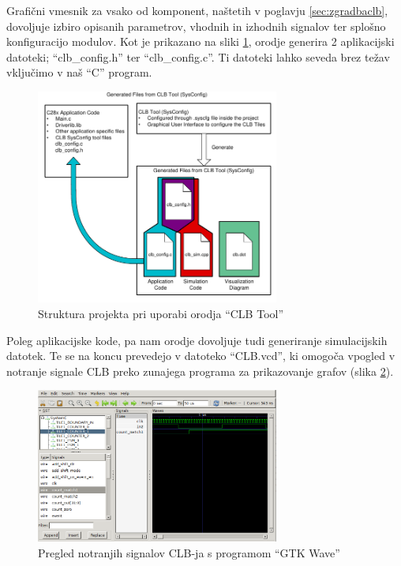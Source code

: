 \documentclass[a4paper]{article}
\begin{document}
\begin{sloppypar}
Grafični vmesnik za vsako od komponent, naštetih v poglavju
\ref{sec:zgradbaclb}, dovoljuje izbiro opisanih parametrov, vhodnih in izhodnih
signalov ter splošno konfiguracijo modulov. Kot je prikazano na sliki
\ref{fig:clbtool_struktura}, orodje generira 2 aplikacijski datoteki;
``clb\_config.h'' ter ``clb\_config.c''. Ti datoteki lahko seveda brez težav
vključimo v naš ``C'' program.

\begin{figure}[htb]
    \centerline{\includegraphics[width=8cm]{clbtool_struktura}}
    \caption{Struktura projekta pri uporabi orodja ``CLB Tool''
             \cite[Pogl.~1]{clb-user-guide}}
    \label{fig:clbtool_struktura} 
\end{figure} 

Poleg aplikacijske kode, pa nam orodje dovoljuje tudi generiranje simulacijskih
datotek. Te se na koncu prevedejo v datoteko ``CLB.vcd'', ki omogoča vpogled v
notranje signale CLB preko zunajega programa za prikazovanje grafov (slika
\ref{fig:clbtool_simulacija}).

\begin{figure}[htb]
    \centerline{\includegraphics[width=8cm]{gtkwave}}
    \caption{Pregled notranjih signalov CLB-ja s programom ``GTK Wave''}
    \label{fig:clbtool_simulacija} 
\end{figure} 


\end{sloppypar}
\end{document}
